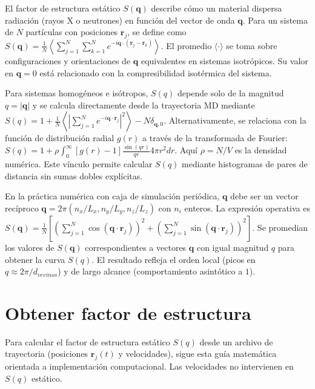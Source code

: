 \documentclass{tufte-handout}
\begin{document}
El factor de estructura estático $S(\mathbf{q})$ describe cómo un material dispersa radiación (rayos X o neutrones) en función del vector de onda $\mathbf{q}$.  
Para un sistema de $N$ partículas con posiciones $\mathbf{r}_j$, se define como $S(\mathbf{q}) = \frac{1}{N} \left\langle \sum_{j=1}^N \sum_{k=1}^N e^{-i\mathbf{q}\cdot(\mathbf{r}_j - \mathbf{r}_k)} \right\rangle$.  
El promedio $\langle \cdot \rangle$ se toma sobre configuraciones y orientaciones de $\mathbf{q}$ equivalentes en sistemas isotrópicos.  
Su valor en $\mathbf{q}=0$ está relacionado con la compresibilidad isotérmica del sistema.

Para sistemas homogéneos e isótropos, $S(q)$ depende solo de la magnitud $q = |\mathbf{q}|$ y se calcula directamente desde la trayectoria MD mediante $S(q) = 1 + \frac{1}{N} \left\langle \left| \sum_{j=1}^N e^{-i\mathbf{q}\cdot\mathbf{r}_j} \right|^2 \right\rangle - N \delta_{\mathbf{q},0}$.  
Alternativamente, se relaciona con la función de distribución radial $g(r)$ a través de la transformada de Fourier: $S(q) = 1 + \rho \int_0^\infty [g(r) - 1] \frac{\sin(qr)}{qr} 4\pi r^2 dr$.  
Aquí $\rho = N/V$ es la densidad numérica.  
Este vínculo permite calcular $S(q)$ mediante histogramas de pares de distancia sin sumas dobles explícitas.

En la práctica numérica con caja de simulación periódica, $\mathbf{q}$ debe ser un vector recíproco $\mathbf{q} = 2\pi (n_x/L_x, n_y/L_y, n_z/L_z)$ con $n_i$ enteros.  
La expresión operativa es $S(\mathbf{q}) = \frac{1}{N} \left[ \left( \sum_{j=1}^N \cos(\mathbf{q}\cdot\mathbf{r}_j) \right)^2 + \left( \sum_{j=1}^N \sin(\mathbf{q}\cdot\mathbf{r}_j) \right)^2 \right]$.  
Se promedian los valores de $S(\mathbf{q})$ correspondientes a vectores $\mathbf{q}$ con igual magnitud $q$ para obtener la curva $S(q)$.  
El resultado refleja el orden local (picos en $q \approx 2\pi/d_{vecinos}$) y de largo alcance (comportamiento asintótico a $1$).

\newpage

\section{Obtener factor de estructura}

Para calcular el factor de estructura estático $S(q)$ desde un archivo de trayectoria (posiciones $\mathbf{r}_j(t)$ y velocidades), sigue esta guía matemática orientada a implementación computacional. Las velocidades no intervienen en $S(q)$ estático.
\end{document}
